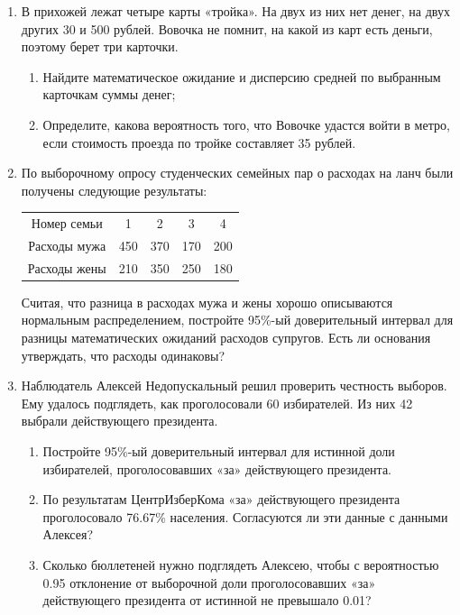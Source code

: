 \begin{enumerate}[resume]
	\item В прихожей лежат четыре карты «тройка». На двух из них нет денег, на двух других 30 и 500 рублей. Вовочка не помнит, на какой из карт есть деньги, поэтому берет три карточки.

	 \begin{enumerate}
		\item Найдите математическое ожидание и дисперсию средней по выбранным карточкам суммы денег;
		\item Определите, какова вероятность того, что Вовочке удастся войти в метро, если стоимость проезда по тройке составляет 35 рублей.
	\end{enumerate}

	\item По выборочному опросу студенческих семейных пар о расходах на ланч были получены следующие результаты:

	\begin{center}
		\begin{tabular}{ccccc}
			\toprule
			Номер семьи & 1 & 2 & 3 & 4\\
			Расходы мужа & 450 & 370 & 170 & 200\\
			Расходы жены & 210 & 350 & 250 & 180\\
			\bottomrule
		\end{tabular}
	\end{center}

	Считая, что разница в расходах мужа и жены хорошо описываются нормальным распределением, постройте 95\%-ый доверительный интервал для разницы математических ожиданий расходов супругов. Есть ли основания утверждать, что расходы одинаковы?

	\item Наблюдатель Алексей Недопускальный решил проверить честность выборов. Ему удалось подглядеть, как проголосовали 60 избирателей. Из них 42 выбрали действующего президента.

	\begin{enumerate}
		\item Постройте 95\%-ый доверительный интервал для истинной доли избирателей, проголосовавших «за» действующего президента.
		\item По результатам ЦентрИзберКома «за» действующего президента проголосовало 76.67\% населения. Согласуются ли эти данные с данными Алексея?
		\item Сколько бюллетеней нужно подглядеть Алексею, чтобы с вероятностью 0.95 отклонение от выборочной доли проголосовавших «за» действующего президента от истинной не превышало 0.01?
	\end{enumerate}

\end{enumerate}



